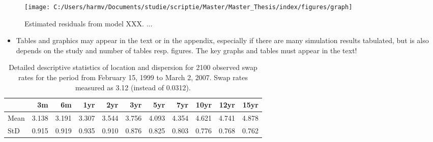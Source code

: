 \documentclass[a4paper,11pt]{article}
\providecommand{\tightlist}{%
  \setlength{\itemsep}{0pt}\setlength{\parskip}{0pt}}
\begin{document}
\begin{figure}

{\centering \texttt{[image: C:/Users/harmv/Documents/studie/scriptie/Master/Master\_Thesis/index/figures/graph]} 

}

\caption{Estimated residuals from model XXX. ...}\label{fig:graph}
\end{figure}
\begin{itemize}
\tightlist
\item
  Tables and graphics may appear in the text or in the appendix, especially if
  there are many simulation results tabulated, but is also depends on the study
  and number of tables resp. figures. The key graphs and tables must appear in
  the text!
\end{itemize}
\begin{table}[H]

\caption{\label{tab:table}Detailed descriptive statistics of location and dispersion for 2100 observed swap rates for the period from February 15, 1999 to March 2, 2007. Swap rates measured as 3.12 (instead of 0.0312).}
\centering
\begin{tabular}[t]{lrrrrrrrrrr}
\toprule
  & 3m & 6m & 1yr & 2yr & 3yr & 5yr & 7yr & 10yr & 12yr & 15yr\\
\midrule
Mean & 3.138 & 3.191 & 3.307 & 3.544 & 3.756 & 4.093 & 4.354 & 4.621 & 4.741 & 4.878\\
StD & 0.915 & 0.919 & 0.935 & 0.910 & 0.876 & 0.825 & 0.803 & 0.776 & 0.768 & 0.762\\
\midrule
\bottomrule
\end{tabular}
\end{table}
\end{document}
